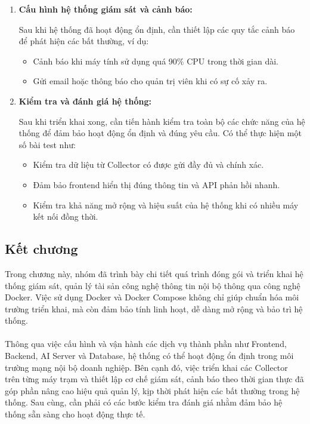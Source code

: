 \begin{enumerate}[leftmargin=*]
    \item \textbf{Cấu hình hệ thống giám sát và cảnh báo:}

    Sau khi hệ thống đã hoạt động ổn định, cần thiết lập các quy tắc cảnh báo để phát hiện các bất thường, ví dụ:
    \begin{itemize}[label=--]
        \item Cảnh báo khi máy tính sử dụng quá 90\% CPU trong thời gian dài.
        \item Gửi email hoặc thông báo cho quản trị viên khi có sự cố xảy ra.
    \end{itemize}

    \item \textbf{Kiểm tra và đánh giá hệ thống:}

    Sau khi triển khai xong, cần tiến hành kiểm tra toàn bộ các chức năng của hệ thống để đảm bảo hoạt động ổn định và đúng yêu cầu. Có thể thực hiện một số bài test như:
    \begin{itemize}[label=--]
        \item Kiểm tra dữ liệu từ Collector có được gửi đầy đủ và chính xác.
        \item Đảm bảo frontend hiển thị đúng thông tin và API phản hồi nhanh.
        \item Kiểm tra khả năng mở rộng và hiệu suất của hệ thống khi có nhiều máy kết nối đồng thời.
    \end{itemize}
\end{enumerate}

\subsection{Kết chương}
\noindent Trong chương này, nhóm đã trình bày chi tiết quá trình đóng gói và triển khai hệ thống giám sát, quản lý tài sản công nghệ thông tin nội bộ thông qua công nghệ Docker. Việc sử dụng Docker và Docker Compose không chỉ giúp chuẩn hóa môi trường triển khai, mà còn đảm bảo tính linh hoạt, dễ dàng mở rộng và bảo trì hệ thống. \\ \\
Thông qua việc cấu hình và vận hành các dịch vụ thành phần như Frontend, Backend, AI Server và Database, hệ thống có thể hoạt động ổn định trong môi trường mạng nội bộ doanh nghiệp. Bên cạnh đó, việc triển khai các Collector trên từng máy trạm và thiết lập cơ chế giám sát, cảnh báo theo thời gian thực đã góp phần nâng cao hiệu quả quản lý, kịp thời phát hiện các bất thường trong hệ thống. Sau cùng, cần phải có các bước kiểm tra đánh giá nhằm đảm bảo hệ thống sẵn sàng cho hoạt động thực tế.